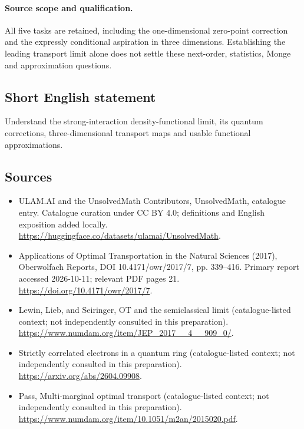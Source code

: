\documentclass[11pt]{article}
\begin{document}
\paragraph{Source scope and qualification.}
All five tasks are retained, including the one-dimensional zero-point correction and the expressly conditional aspiration in three dimensions. Establishing the leading transport limit alone does not settle these next-order, statistics, Monge and approximation questions.
\subsection{Short English statement}
Understand the strong-interaction density-functional limit, its quantum corrections, three-dimensional transport maps and usable functional approximations.
\subsection{Sources}
\begin{itemize}
\item[\hypertarget{source:statement:1}{S1}] ULAM.AI and the UnsolvedMath Contributors, UnsolvedMath, catalogue entry. Catalogue curation under CC BY 4.0; definitions and English exposition added locally.
\url{https://huggingface.co/datasets/ulamai/UnsolvedMath}.
\item[\hypertarget{source:statement:2}{S2}] Applications of Optimal Transportation in the Natural Sciences (2017), Oberwolfach Reports, DOI 10.4171/owr/2017/7, pp. 339--416. Primary report accessed 2026-10-11; relevant PDF pages 21.
\url{https://doi.org/10.4171/owr/2017/7}.
\item[\hypertarget{source:statement:3}{S3}] Lewin, Lieb, and Seiringer, OT and the semiclassical limit (catalogue-listed context; not independently consulted in this preparation).
\url{https://www.numdam.org/item/JEP_2017__4__909_0/}.
\item[\hypertarget{source:statement:4}{S4}] Strictly correlated electrons in a quantum ring (catalogue-listed context; not independently consulted in this preparation).
\url{https://arxiv.org/abs/2604.09908}.
\item[\hypertarget{source:statement:5}{S5}] Pass, Multi-marginal optimal transport (catalogue-listed context; not independently consulted in this preparation).
\url{https://www.numdam.org/item/10.1051/m2an/2015020.pdf}.
\end{itemize}
\label{end:statement}
\end{document}
